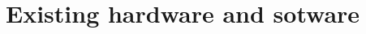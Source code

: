 \documentclass[Main]{subfiles}
\begin{document}
\section{Existing hardware and sotware}
\end{document}
